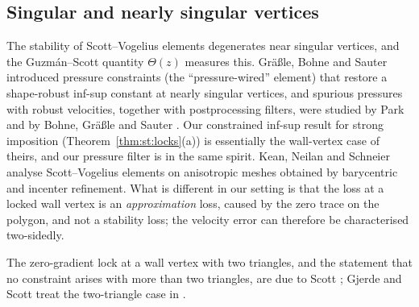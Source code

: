 \subsection{Singular and nearly singular vertices}
The stability of Scott--Vogelius elements degenerates near singular vertices, and the Guzm\'an--Scott quantity $\Theta(z)$ \cite{GuzmanScott2019} measures this. Gr\"a\ss le, Bohne and Sauter \cite{GrassleBohneSauter2024} introduced pressure constraints (the ``pressure-wired'' element) that restore a shape-robust inf-sup constant at nearly singular vertices, and spurious pressures with robust velocities, together with postprocessing filters, were studied by Park \cite{Park2020} and by Bohne, Gr\"a\ss le and Sauter \cite{BohneGrassleSauter2025}. Our constrained inf-sup result for strong imposition (Theorem~\ref{thm:st:locks}(a)) is essentially the wall-vertex case of theirs, and our pressure filter is in the same spirit. Kean, Neilan and Schneier \cite{KeanNeilanSchneier2022} analyse Scott--Vogelius elements on anisotropic meshes obtained by barycentric and incenter refinement. What is different in our setting is that the loss at a locked wall vertex is an \emph{approximation} loss, caused by the zero trace on the polygon, and not a stability loss; the velocity error can therefore be characterised two-sidedly.

The zero-gradient lock at a wall vertex with two triangles, and the statement that no constraint arises with more than two triangles, are due to Scott \cite[Theorem~1]{ScottPrize}; Gjerde and Scott treat the two-triangle case in \cite[\S3.4, App.~B]{GjerdeScott2024}.


